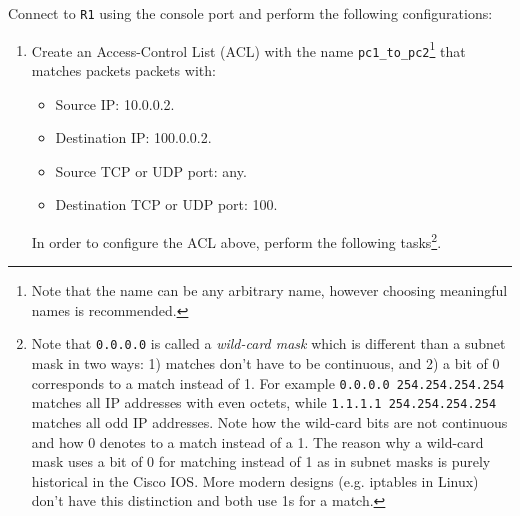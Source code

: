 \documentclass[pdftex,12pt,a4paper]{article}
\begin{document}
                Connect to \texttt{R1} using the console port and perform the
                following configurations:
                \begin{enumerate}
                    \item Create an Access-Control List (ACL) with the name
                        \texttt{pc1\_to\_pc2}\footnote{Note that the name can be
                            any arbitrary name, however choosing meaningful
                        names is recommended.} that matches
                        packets packets with:
                        \begin{itemize}
                            \item Source IP: 10.0.0.2.
                            \item Destination IP: 100.0.0.2.
                            \item Source TCP or UDP port: any.
                            \item Destination TCP or UDP port: 100.
                        \end{itemize}
                        
                        In order to configure the ACL above, perform the
                        following tasks\footnote{Note that \texttt{0.0.0.0}
                        is called a \emph{wild-card mask} which is different
                        than a subnet mask in two ways: 1) matches don't have to
                        be continuous, and 2) a bit of 0 corresponds to a match
                        instead of 1. For example \texttt{0.0.0.0
                        254.254.254.254} matches all IP addresses with even
                        octets, while \texttt{1.1.1.1 254.254.254.254} matches
                        all odd IP addresses. Note how the wild-card bits are
                        not continuous and how 0 denotes to a match instead of a
                        1. The reason why a wild-card mask
                        uses a bit of 0 for matching instead of 1 as in subnet
                        masks is purely historical in the Cisco IOS. More
                        modern designs (e.g.  iptables in Linux) don't have this
                        distinction and both use 1s for a match.}.


\end{enumerate}
\end{document}
